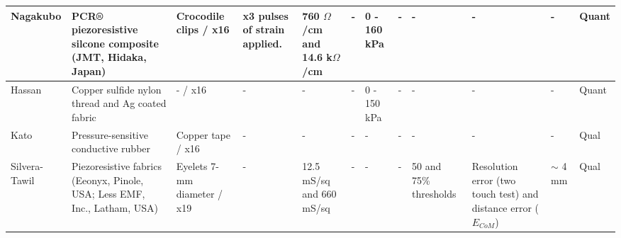 \begin{landscape}
\begin{table}[H]
\begin{tabular}{|L{1.7cm}|L{2.8cm}|L{2.0cm}|L{2.1cm}|L{2.2cm}|L{2.0cm}|L{1.7cm}|L{1.7cm}|L{2.4cm}|L{2.2cm}|L{1.6cm}|L{1.5cm}|}
			Nagakubo \citep{Nagakubo2007} & PCR® piezoresistive silcone composite (JMT, Hidaka, Japan) & Crocodile clips / x16 & x3 pulses of strain applied. & 760 $\Omega$/cm and 14.6 k$\Omega$/cm & - & 0 - 160 kPa & - & - & - & - & Quant \\ \hline
			
			Hassan \citep{Hassan2009} & Copper sulfide nylon thread and Ag coated fabric & - / x16 & - & - & - & 0 - 150 kPa & - & - & - & - & Quant \\ \hline
			
			Kato \citep{Kato2007b} & Pressure-sensitive conductive rubber & Copper tape / x16 & - & - & - & - & - & - & - & - & Qual \\ \hline
			
			Silvera-Tawil \citep{Tawil2011} & Piezoresistive fabrics (Eeonyx, Pinole, USA; Less EMF, Inc., Latham, USA) & Eyelets 7-mm diameter / x19 & - & 12.5 mS/sq and 660 mS/sq & - & - & - & 50 and 75\% thresholds & Resolution error (two touch test) and distance error ($E_{CoM}$) & $\sim$ 4 mm & Qual \\ \hline
			
		\end{tabular}
	\end{table}
\end{landscape}

